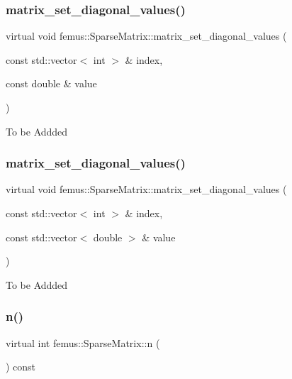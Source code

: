 \subsubsection{\texorpdfstring{matrix\+\_\+set\+\_\+diagonal\+\_\+values()}{matrix\_set\_diagonal\_values()}\hspace{0.1cm}{\footnotesize\ttfamily [1/2]}}
{\footnotesize\ttfamily virtual void femus\+::\+Sparse\+Matrix\+::matrix\+\_\+set\+\_\+diagonal\+\_\+values (\begin{DoxyParamCaption}\item[{const std\+::vector$<$ int $>$ \&}]{index,  }\item[{const double \&}]{value }\end{DoxyParamCaption})\hspace{0.3cm}{\ttfamily [pure virtual]}}

To be Addded \mbox{\label{classfemus_1_1_sparse_matrix_a9f5b60f4154133a07eddeb67cb5a3650}} 
\subsubsection{\texorpdfstring{matrix\+\_\+set\+\_\+diagonal\+\_\+values()}{matrix\_set\_diagonal\_values()}\hspace{0.1cm}{\footnotesize\ttfamily [2/2]}}
{\footnotesize\ttfamily virtual void femus\+::\+Sparse\+Matrix\+::matrix\+\_\+set\+\_\+diagonal\+\_\+values (\begin{DoxyParamCaption}\item[{const std\+::vector$<$ int $>$ \&}]{index,  }\item[{const std\+::vector$<$ double $>$ \&}]{value }\end{DoxyParamCaption})\hspace{0.3cm}{\ttfamily [pure virtual]}}

To be Addded \mbox{\label{classfemus_1_1_sparse_matrix_aac007c0926a2f3ffe6f01ba97608ea15}} 
\subsubsection{\texorpdfstring{n()}{n()}}
{\footnotesize\ttfamily virtual int femus\+::\+Sparse\+Matrix\+::n (\begin{DoxyParamCaption}{ }\end{DoxyParamCaption}) const\hspace{0.3cm}{\ttfamily [pure virtual]}}

